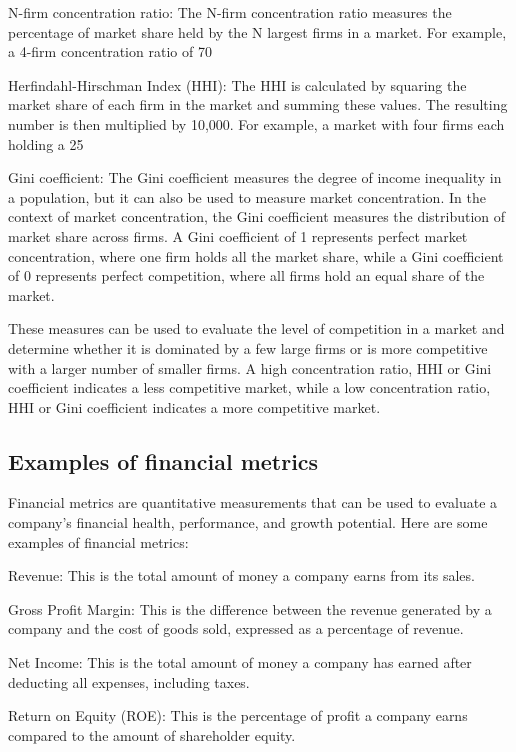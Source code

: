 \documentclass[12pt, a4paper, oneside]{article}
\begin{document}
N-firm concentration ratio: The N-firm concentration ratio measures the percentage of market share held by the N largest firms in a market. For example, a 4-firm concentration ratio of 70%

Herfindahl-Hirschman Index (HHI): The HHI is calculated by squaring the market share of each firm in the market and summing these values. The resulting number is then multiplied by 10,000. For example, a market with four firms each holding a 25%

Gini coefficient: The Gini coefficient measures the degree of income inequality in a population, but it can also be used to measure market concentration. In the context of market concentration, the Gini coefficient measures the distribution of market share across firms. A Gini coefficient of 1 represents perfect market concentration, where one firm holds all the market share, while a Gini coefficient of 0 represents perfect competition, where all firms hold an equal share of the market.

These measures can be used to evaluate the level of competition in a market and determine whether it is dominated by a few large firms or is more competitive with a larger number of smaller firms. A high concentration ratio, HHI or Gini coefficient indicates a less competitive market, while a low concentration ratio, HHI or Gini coefficient indicates a more competitive market.

\subsection{ Examples of financial metrics }
Financial metrics are quantitative measurements that can be used to evaluate a company's financial health, performance, and growth potential. Here are some examples of financial metrics:

Revenue: This is the total amount of money a company earns from its sales.

Gross Profit Margin: This is the difference between the revenue generated by a company and the cost of goods sold, expressed as a percentage of revenue.

Net Income: This is the total amount of money a company has earned after deducting all expenses, including taxes.

Return on Equity (ROE): This is the percentage of profit a company earns compared to the amount of shareholder equity.
\end{document}
